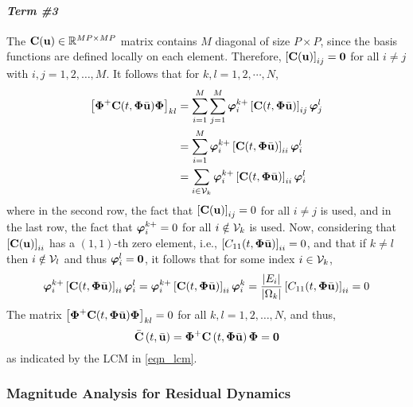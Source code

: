 \paragraph*{\textit{Term \#3}} The $\mathbf{C}(\mathbf{u})\in\mathbb{R}^{MP\times MP}$ matrix contains $M$ diagonal of size $P\times P$, since the basis functions are defined locally on each element. Therefore, $\left[\mathbf{C}(\mathbf{u})\right]_{ij} = \boldsymbol{0}$ for all $i \neq j$ with $i,j=1,2,\dots,M$. It follows that for $k,l=1,2,\cdots,N$,
\begin{subequations}
    \begin{align}
        \left[\boldsymbol{\Phi}^{+}\mathbf{C}(t,\boldsymbol{\Phi}\bar{\mathbf{u}})\boldsymbol{\Phi}\right]_{kl} &= \sum_{i=1}^{M}\sum_{j=1}^{M}\boldsymbol{\varphi}_{i}^{k+}\left[\mathbf{C}(t,\boldsymbol{\Phi}\bar{\mathbf{u}})\right]_{ij}\boldsymbol{\varphi}_{j}^{l}\\
        &= \sum_{i=1}^{M}\boldsymbol{\varphi}_{i}^{k+}\left[\mathbf{C}(t,\boldsymbol{\Phi}\bar{\mathbf{u}})\right]_{ii}\boldsymbol{\varphi}_{i}^{l}\\
        &= \sum_{i\in\mathcal{V}_k} \boldsymbol{\varphi}_{i}^{k+}\left[\mathbf{C}(t,\boldsymbol{\Phi}\bar{\mathbf{u}})\right]_{ii}\boldsymbol{\varphi}_{i}^{l}
    \end{align}
\end{subequations}
where in the second row, the fact that $\left[\mathbf{C}(\mathbf{u})\right]_{ij} = 0$ for all $i\neq j$ is used, and in the last row, the fact that $\boldsymbol{\varphi}_{i}^{k+}=0$ for all $i\notin\mathcal{V}_k$ is used. Now, considering that $\left[\mathbf{C}(\mathbf{u})\right]_{ii}$ has a $(1,1)$-th zero element, i.e., $\left[C_{11}(t,\boldsymbol{\Phi}\bar{\mathbf{u}})\right]_{ii} = 0$, and that if $k\neq l$ then $i\notin\mathcal{V}_l$ and thus $\boldsymbol{\varphi}_i^{l}=\boldsymbol{0}$, it follows that for some index $i\in\mathcal{V}_k$,
\begin{equation}
    \boldsymbol{\varphi}_{i}^{k+}\left[\mathbf{C}(t,\boldsymbol{\Phi}\bar{\mathbf{u}})\right]_{ii}\boldsymbol{\varphi}_{i}^{l} = \boldsymbol{\varphi}_{i}^{k+}\left[\mathbf{C}(t,\boldsymbol{\Phi}\bar{\mathbf{u}})\right]_{ii}\boldsymbol{\varphi}_{i}^{k} = \frac{|E_i|}{|\Omega_k|}\left[C_{11}(t,\boldsymbol{\Phi}\bar{\mathbf{u}})\right]_{ii} = 0
\end{equation}
The matrix $\left[\boldsymbol{\Phi}^{+}\mathbf{C}(t,\boldsymbol{\Phi}\bar{\mathbf{u}})\boldsymbol{\Phi}\right]_{kl} = 0$ for all $k,l=1,2,\dots,N$, and thus,
\begin{equation}
    \bar{\mathbf{C}}\left(t,\bar{\mathbf{u}}\right) = \boldsymbol{\Phi}^{+}\mathbf{C}\left(t,\boldsymbol{\Phi}\bar{\mathbf{u}}\right)\boldsymbol{\Phi} = \boldsymbol{0}
\end{equation}
as indicated by the LCM in \cref{eqn_lcm}.

\subsubsection{Magnitude Analysis for Residual Dynamics}

